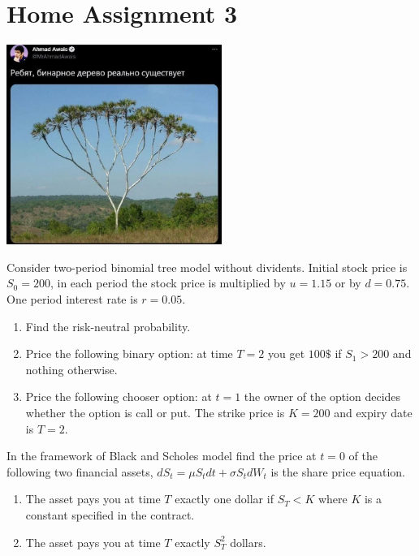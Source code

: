 \documentclass[12pt]{article}
\begin{document}
\newpage
\section*{Home Assignment 3}
\begin{enumerate}
  
  
  \begin{minipage}{0.42\linewidth}
    \includegraphics[width=7cm]{tree.jpg}  
  \end{minipage}
  \begin{minipage}{0.58\linewidth}
    \item Consider two-period binomial tree model without dividents.
    Initial stock price is $S_0 = 200$, 
    in each period the stock price is multiplied by $u=1.15$ or by $d=0.75$. 
    One period interest rate is $r=0.05$. 
    
    \begin{enumerate}
    \item Find the risk-neutral probability. 
    \item Price the following binary option: at time $T=2$ you get $100\$ $ if $S_1 > 200$ and nothing otherwise. 
    \item Price the following chooser option: at $t=1$ the owner 
    of the option decides whether the option is call or put. The strike price 
    is $K=200$ and expiry date is $T=2$. 
    \end{enumerate}
    \end{minipage}
  
  
  
  \item In the framework of Black and Scholes model find the price at $t=0$ of the following two 
  financial assets, $dS_t = \mu S_t dt + \sigma S_t dW_t$ is the share price equation. 
  \begin{enumerate}
    \item The asset pays you at time $T$ exactly one dollar if $S_T < K$ where $K$ is a constant 
    specified in the contract. 
    \item The asset pays you at time $T$ exactly $S_T^2$ dollars.
  \end{enumerate}
  

\end{enumerate}
\end{document}
